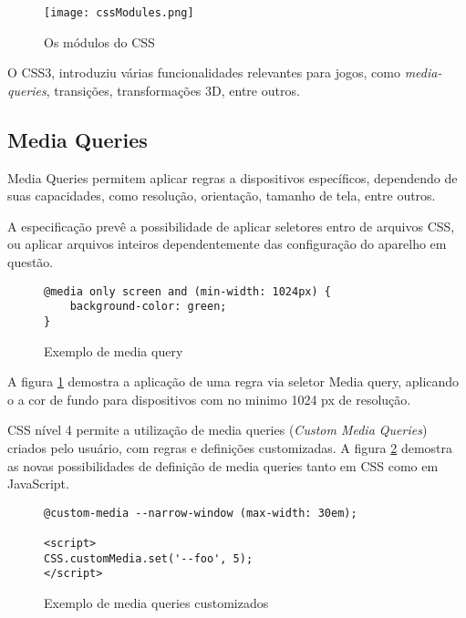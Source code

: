 \begin{figure}
    \centering
    \texttt{[image: cssModules.png]}
    \caption{Os módulos do CSS}
\end{figure}

O CSS3, introduziu várias funcionalidades relevantes para jogos, como
\textit{media-queries}, transições, transformações 3D, entre outros.

\subsection{Media Queries}

Media Queries permitem aplicar regras a dispositivos específicos, dependendo de suas
capacidades, como resolução, orientação, tamanho de tela, entre outros.

A especificação prevê a possibilidade de aplicar seletores  entro de arquivos
CSS, ou aplicar arquivos inteiros dependentemente das configuração do aparelho
em questão.

\begin{figure}
\centering
\begin{verbatim}
@media only screen and (min-width: 1024px) {
    background-color: green;
}
\end{verbatim}
\caption{Exemplo de media query}
\label{fig:MediaQuery}
\end{figure}

A figura \ref{fig:MediaQuery} demostra a aplicação de uma regra via
seletor Media query, aplicando o a cor de fundo para dispositivos com no
minimo 1024 px de resolução.

CSS nível 4 permite a utilização de media queries (\textit{Custom
Media Queries}) criados pelo usuário, com regras e definições
customizadas. A figura \ref{fig:MediaQueryCustom} demostra as novas
possibilidades de definição de media queries tanto em CSS como em
JavaScript.

\begin{figure}
\centering
\begin{verbatim}
@custom-media --narrow-window (max-width: 30em);

<script>
CSS.customMedia.set('--foo', 5);
</script>

\end{verbatim}
\caption{Exemplo de media queries customizados}
\label{fig:MediaQueryCustom}
\end{figure}

